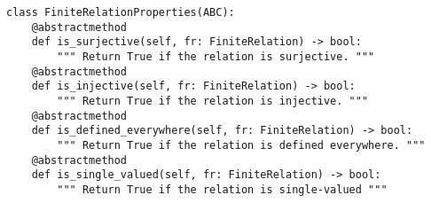 \par\begin{minipage}{66ex}
\begin{verbatim}
class FiniteRelationProperties(ABC):
    @abstractmethod
    def is_surjective(self, fr: FiniteRelation) -> bool:
        """ Return True if the relation is surjective. """
    @abstractmethod
    def is_injective(self, fr: FiniteRelation) -> bool:
        """ Return True if the relation is injective. """
    @abstractmethod
    def is_defined_everywhere(self, fr: FiniteRelation) -> bool:
        """ Return True if the relation is defined everywhere. """
    @abstractmethod
    def is_single_valued(self, fr: FiniteRelation) -> bool:
        """ Return True if the relation is single-valued """
\end{verbatim}
\end{minipage}\par